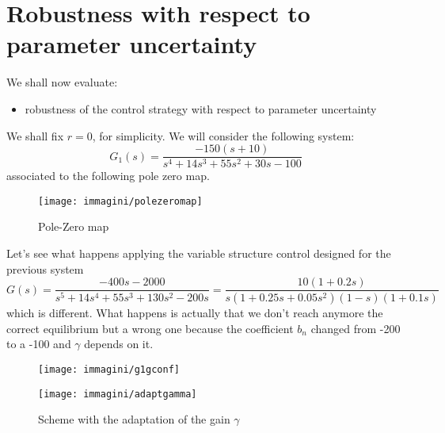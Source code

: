 \section{Robustness with respect to parameter uncertainty}
We shall now evaluate:
\begin{itemize}
	\item robustness of the control strategy with respect to parameter uncertainty
\end{itemize}
We shall fix $r=0$, for simplicity. We will consider the following system: \[
G_1(s)=\frac{-150(s+10)}{s^4+14s^3+55s^2+30s-100}
\]associated to the following pole zero map. 
\begin{figure}[H]
	\centering
	\texttt{[image: immagini/polezeromap]}
	\caption{Pole-Zero map}
	\label{fig:polezeromap}
\end{figure}
Let's see what happens applying the variable structure control designed for the previous system  \[
G(s)=\frac{-400s-2000}{s^5+14s^4+55s^3+130s^2-200s}=\frac{10(1+0.2s)}{s(1+0.25s+0.05s^2)(1-s)(1+0.1s)}
\] which is different. What happens is actually that we don't reach anymore the correct equilibrium but a wrong one because the coefficient $b_n$ changed from -200 to a -100 and $\gamma$ depends on it.
\begin{figure}[H]
	\centering
	\texttt{[image: immagini/g1gconf]}
	\caption{}
	\label{fig:g1gconf}
\end{figure}



\begin{figure}[H]
	\centering
	\texttt{[image: immagini/adaptgamma]}
	\caption{Scheme with the adaptation of the gain $\gamma$}
	\label{fig:adaptgamma}
\end{figure}
